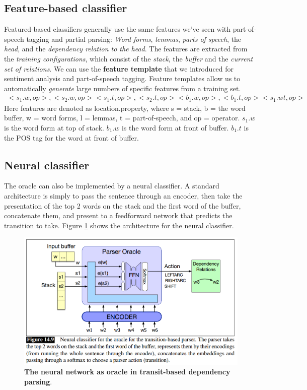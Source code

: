\documentclass[11pt]{article}
\begin{document}
\subsection{Feature-based classifier}\label{sec: feature_classifier}
Featured-based classifiers generally use the same features we’ve seen with part-of-speech tagging and partial parsing: \emph{Word forms}, \emph{lemmas}, \emph{parts of speech}, the \emph{head}, and the \emph{dependency relation to the head}. The features are extracted from the \emph{training configurations}, which consist
of the \emph{stack}, the \emph{buffer} and the \emph{current set of relations}. We can use the \textbf{feature template} that we introduced for sentiment analysis and
part-of-speech tagging. Feature templates allow us to automatically \emph{generate} large numbers of specific features from a training set. 
\begin{align*}
<s_1.w , op>, <s_2.w, op > <s_1.t, op>, <s_2.t, op>  <b_1.w, op>, <b_1.t , op> <s_1.wt , op>
\end{align*} Here features are denoted as location.property, where s = stack, b = the word
buffer, w = word forms, l = lemmas, t = part-of-speech, and op = operator. $s_1.w$ is the word form at top of stack. $b_1.w$ is the word form at front of buffer. $b_1.t$ is the POS tag for the word at front of buffer. 

\subsection{Neural classifier}
The oracle can also be implemented by a neural classifier. A standard architecture is simply to pass the sentence through an encoder, then take the presentation of the
top 2 words on the stack and the first word of the buffer, concatenate them, and present to a feedforward network that predicts the transition to take. Figure \ref{fig: neural_transit_dep_parse} shows the architecture for the neural classifier. 
\begin{figure}
\begin{minipage}[t]{1\linewidth}
  \centering
  \centerline{\includegraphics[scale = 0.4]{neural_transit_dep_parse.png}}
\end{minipage}
\caption{\footnotesize{\textbf{The neural network as oracle in transit-based dependency parsing}.}}
\label{fig: neural_transit_dep_parse}
\end{figure}
\end{document}
